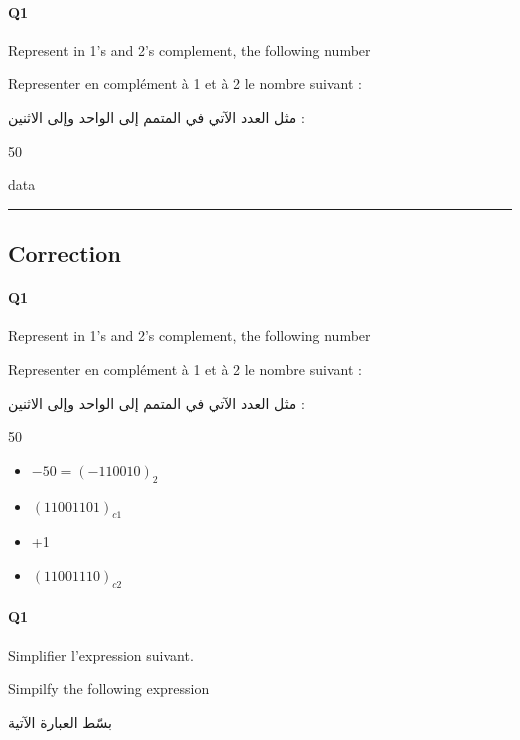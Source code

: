 \pagebreak

\paragraph{Q1}

Represent in 1's and 2's complement, the following number


Representer en complément à 1 et à 2 le nombre suivant :


\begin{arab}[utf]
مثل  العدد الآتي في المتمم إلى الواحد وإلى الاثنين  :
\end{arab}

50


data


\hrule width 1\linewidth
\pagebreak

\subsection{Correction}


\paragraph{Q1}

Represent in 1's and 2's complement, the following number


Representer en complément à 1 et à 2 le nombre suivant :


\begin{arab}[utf]
مثل  العدد الآتي في المتمم إلى الواحد وإلى الاثنين  :
\end{arab}

50


\begin{itemize}
\item $-50 = ( -110010 )_{2}$
\item $( 11001101 )_{c1}$
\item +1
\item $( 11001110 )_{c2}$
\end{itemize}

\pagebreak

\paragraph{Q1}



Simplifier l'expression suivant.



Simpilfy the following expression
\begin{arab}[utf]
بسّط العبارة الآتية
\end{arab}

